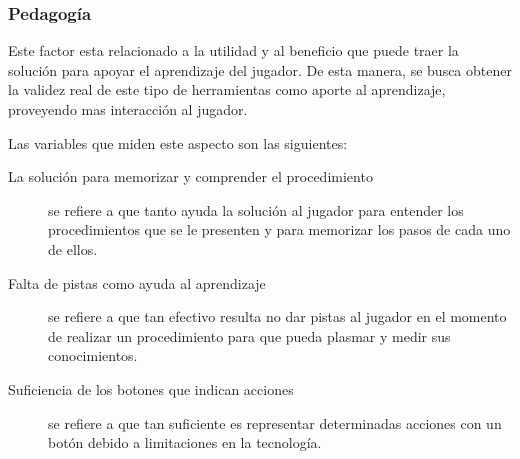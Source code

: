 \subsubsection{Pedagogía}

Este factor esta relacionado a la utilidad y al beneficio que puede traer la
solución para apoyar el aprendizaje del jugador. De esta manera, se busca
obtener la validez real de este tipo de herramientas como aporte al aprendizaje,
proveyendo mas interacción al jugador.

Las variables que miden este aspecto son las siguientes:

\begin{description}

\item[La solución para memorizar y comprender el procedimiento] se refiere a
    que tanto ayuda la solución al jugador para entender los procedimientos que se
    le presenten y para memorizar los pasos de cada uno de ellos.

\item[Falta de pistas como ayuda al aprendizaje] se refiere a que tan efectivo
    resulta no dar pistas al jugador en el momento de realizar un procedimiento
    para que pueda plasmar y medir sus conocimientos.

\item[Suficiencia de los botones que indican acciones] se refiere a que tan
    suficiente es representar determinadas acciones  con un botón debido a
    limitaciones en la tecnología.

\end{description}

